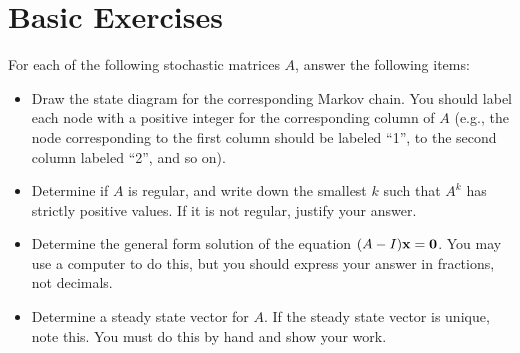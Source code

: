 \section{Basic Exercises}

For each of the following stochastic matrices $A$, answer the
following items:
\begin{itemize}
\item
  Draw the state diagram for the corresponding Markov chain. You
  should label each node with a positive integer for the corresponding
  column of $A$ (e.g., the node corresponding to the first column
  should be labeled \enquote{1}, to the second column labeled
  \enquote{2}, and so on).
\item
  Determine if $A$ is regular, and write down the smallest $k$ such
  that $A^k$ has strictly positive values. If it is not regular,
  justify your answer.
\item
  Determine the general form solution of the equation
  $(A-I)\mathbf x = \mathbf 0$. You may use a computer to do this,
  but you should express your answer in fractions, not decimals.
\item
  Determine a steady state vector for $A$. If the steady state vector
  is unique, note this. You must do this by hand and show your work.
\end{itemize}
